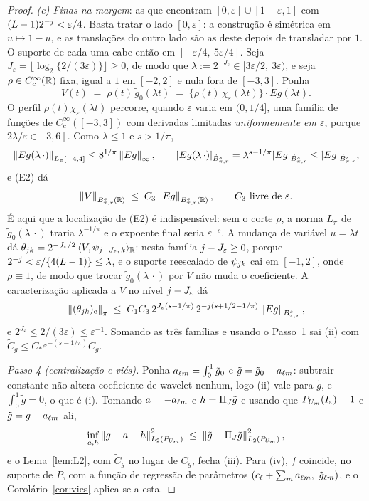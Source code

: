 \documentclass[11pt,a4paper]{article}
\begin{document}
\begin{proof}
\emph{(c) Finas na margem}: as que encontram
$[0,\varepsilon]\cup[1-\varepsilon,1]$ com $(L-1)2^{-j} < \varepsilon/4$.
Basta tratar o lado $[0,\varepsilon]$: a construção é simétrica em
$u \mapsto 1-u$, e as translações do outro lado são as deste depois de
transladar por $1$. O suporte de cada uma cabe então em
$[-\varepsilon/4,\ 5\varepsilon/4]$. Seja
$J_{\varepsilon} = \lfloor \log_{2}\{2/(3\varepsilon)\}\rfloor \ge 0$, de modo
que $\lambda := 2^{-J_{\varepsilon}} \in [3\varepsilon/2,\ 3\varepsilon)$, e
seja $\rho \in C^{\infty}_{c}(\mathbb{R})$ fixa, igual a $1$ em $[-2,2]$ e nula fora
de $[-3,3]$. Ponha
\[
  V(t) \;=\; \rho(t)\,\tilde g_{0}(\lambda t)
  \;=\; \bigl\{\rho(t)\,\chi_{\varepsilon}(\lambda t)\bigr\}\cdot
  Eg(\lambda t) .
\]
O perfil $\rho(t)\chi_{\varepsilon}(\lambda t)$ percorre, quando
$\varepsilon$ varia em $(0,1/4]$, uma família de funções de
$C^{\infty}_{c}([-3,3])$ com derivadas limitadas \emph{uniformemente em
$\varepsilon$}, porque $2\lambda/\varepsilon \in [3, 6]$. Como
$\lambda \le 1$ e $s > 1/\pi$,
\[
  \left\lVert Eg(\lambda\,\cdot) \right\rVert_{L_{\pi}[-4,4]} \le 8^{1/\pi}\left\lVert Eg \right\rVert_{\infty},
  \qquad
  |Eg(\lambda\,\cdot)|_{\dot B^{s}_{\pi,r}} = \lambda^{s-1/\pi}
  |Eg|_{\dot B^{s}_{\pi,r}} \le |Eg|_{\dot B^{s}_{\pi,r}} ,
\]
e (E2) dá
\[
  \left\lVert V \right\rVert_{B^{s}_{\pi,r}(\mathbb{R})} \;\le\;
  C_{3}\left\lVert Eg \right\rVert_{B^{s}_{\pi,r}(\mathbb{R})} ,
  \qquad C_{3} \text{ livre de } \varepsilon .
\]
É aqui que a localização de (E2) é indispensável: sem o corte $\rho$, a
norma $L_{\pi}$ de $\tilde g_{0}(\lambda\,\cdot)$ traria
$\lambda^{-1/\pi}$ e o expoente final seria $\varepsilon^{-s}$.
A mudança de variável $u = \lambda t$ dá
$\theta_{jk} = 2^{-J_{\varepsilon}/2}\,
\langle V, \psi_{j - J_{\varepsilon},\,k} \rangle_{\mathbb{R}}$: nesta família
$j - J_{\varepsilon} \ge 0$, porque
$2^{-j} < \varepsilon/\{4(L-1)\} \le \lambda$, e o suporte reescalado de
$\psi_{jk}$ cai em $[-1,2]$, onde $\rho \equiv 1$, de modo que trocar
$\tilde g_{0}(\lambda\,\cdot)$ por $V$ não muda o coeficiente. A
caracterização aplicada a $V$ no nível $j - J_{\varepsilon}$ dá
\[
  \left\lVert (\theta_{jk})_{\mathrm{c}} \right\rVert_{\pi}
  \;\le\; C_{1}C_{3}\,2^{J_{\varepsilon}(s-1/\pi)}\,
  2^{-j(s+1/2-1/\pi)}\left\lVert Eg \right\rVert_{B^{s}_{\pi,r}},
\]
e $2^{J_{\varepsilon}} \le 2/(3\varepsilon) \le \varepsilon^{-1}$. Somando as
três famílias e usando o Passo~1 sai (ii) com
$\tilde C_{g} \le C_{\ast}\varepsilon^{-(s-1/\pi)}C_{g}$.

\emph{Passo 4 (centralização e viés).} Ponha $a_{\ell m} =
\int_{0}^{1}\tilde g_{0}$ e $\tilde g = \tilde g_{0} - a_{\ell m}$: subtrair
constante não altera coeficiente de wavelet nenhum, logo (ii) vale para
$\tilde g$, e $\int_{0}^{1}\tilde g = 0$, o que é (i). Tomando
$a = -a_{\ell m}$ e $h = \Pi_{J}\tilde g$ e usando que
$P_{U_{m}}(I_{\varepsilon}) = 1$ e $\tilde g = g - a_{\ell m}$ ali,
\[
  \inf_{a,h}\left\lVert g - a - h \right\rVert_{L_{2}(P_{U_{m}})}^{2}
  \;\le\; \left\lVert \tilde g - \Pi_{J}\tilde g \right\rVert_{L_{2}(P_{U_{m}})}^{2},
\]
e o Lema~\ref{lem:L2}, com $\tilde C_{g}$ no lugar de $C_{g}$, fecha (iii).
Para (iv), $f$ coincide, no suporte de $P$, com a função de regressão de
parâmetros $(c_{\ell} + \sum_{m}a_{\ell m},\ \tilde g_{\ell m})$, e o
Corolário~\ref{cor:vies} aplica-se a esta.
\end{proof}
\end{document}

